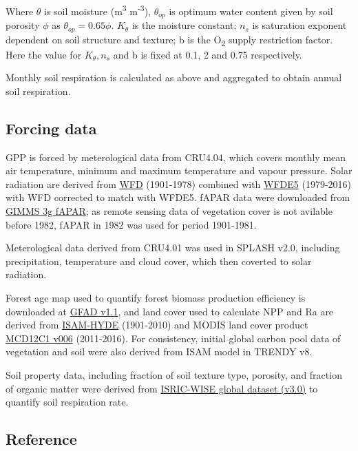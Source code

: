 \documentclass[
]{article}
\begin{document}
Where \(\theta\) is soil moisture (m\textsuperscript{3}
m\textsuperscript{-3}), \(\theta_{op}\) is optimum water content given
by soil porosity \(\phi\) as \(\theta_{op}=0.65 \phi\). \(K_{\theta}\)
is the moisture constant; \(n_s\) is saturation exponent dependent on
soil structure and texture; b is the O\textsubscript{2} supply
restriction factor. Here the value for \(K_{\theta}, n_s\) and b is
fixed at 0.1, 2 and 0.75 respectively.

Monthly soil respiration is calculated as above and aggregated to obtain
annual soil respiration.

\hypertarget{forcing-data}{%
\subsection{Forcing data}\label{forcing-data}}

GPP is forced by meterological data from CRU4.04, which covers monthly
mean air temperature, minimum and maximum temperature and vapour
pressure. Solar radiation are derived from
\href{https://catalogue.ceh.ac.uk/documents/31dd5dd3-85b7-45f3-96a3-6e6023b0ad61}{WFD}
(1901-1978) combined with
\href{https://cds.climate.copernicus.eu/cdsapp\#!/dataset/10.24381/cds.20d54e34?tab=overview}{WFDE5}
(1979-2016) with WFD corrected to match with WFDE5. fAPAR data were
downloaded from
\href{https://drive.google.com/drive/folders/0BwL88nwumpqYaFJmR2poS0d1ZDQ}{GIMMS
3g fAPAR}; as remote sensing data of vegetation cover is not avilable
before 1982, fAPAR in 1982 was used for period 1901-1981.

Meterological data derived from CRU4.01 was used in SPLASH v2.0,
including precipitation, temperature and cloud cover, which then
coverted to solar radiation.

Forest age map used to quantify forest biomass production efficiency is
downloaded at \href{https://doi.pangaea.de/10.1594/PANGAEA.897392}{GFAD
v1.1}, and land cover used to calculate NPP and Ra are derived from
\href{https://www.atmos.illinois.edu/~meiyapp2/datasets.htm}{ISAM-HYDE}
(1901-2010) and MODIS land cover product
\href{https://lpdaac.usgs.gov/products/mcd12c1v006/}{MCD12C1 v006}
(2011-2016). For consistency, initial global carbon pool data of
vegetation and soil were also derived from ISAM model in TRENDY v8.

Soil property data, including fraction of soil texture type, porosity,
and fraction of organic matter were derived from
\href{https://data.isric.org/geonetwork/srv/eng/catalog.search\#/metadata/d9eca770-29a4-4d95-bf93-f32e1ab419c3}{ISRIC-WISE
global dataset (v3.0)} to quantify soil respiration rate.

\hypertarget{reference}{%
\subsection{Reference}\label{reference}}
\end{document}
